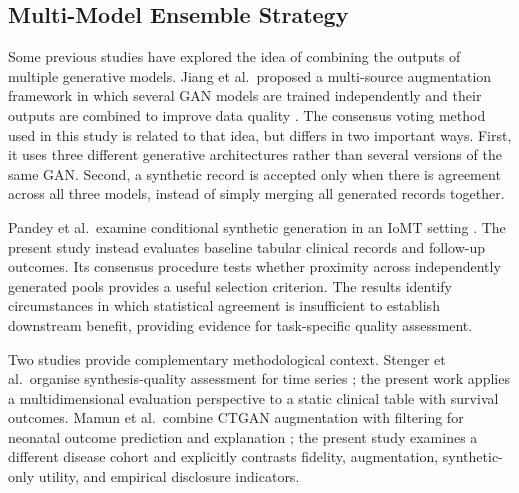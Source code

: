 \documentclass[journal]{IEEEtran}
\begin{document}
\subsection{Multi-Model Ensemble Strategy}

Some previous studies have explored the idea of combining the outputs of multiple generative models. Jiang et al.\ proposed a multi-source augmentation framework in which several GAN models are trained independently and their outputs are combined to improve data quality \cite{jiang2023}. The consensus voting method used in this study is related to that idea, but differs in two important ways. First, it uses three different generative architectures rather than several versions of the same GAN. Second, a synthetic record is accepted only when there is agreement across all three models, instead of simply merging all generated records together.

Pandey et al.\ examine conditional synthetic generation in an IoMT setting \cite{pandey2025}. The present study instead evaluates baseline tabular clinical records and follow-up outcomes. Its consensus procedure tests whether proximity across independently generated pools provides a useful selection criterion. The results identify circumstances in which statistical agreement is insufficient to establish downstream benefit, providing evidence for task-specific quality assessment.

Two studies provide complementary methodological context. Stenger et al.\ organise synthesis-quality assessment for time series \cite{stenger2024}; the present work applies a multidimensional evaluation perspective to a static clinical table with survival outcomes. Mamun et al.\ combine CTGAN augmentation with filtering for neonatal outcome prediction and explanation \cite{mamun2026}; the present study examines a different disease cohort and explicitly contrasts fidelity, augmentation, synthetic-only utility, and empirical disclosure indicators.
\end{document}
